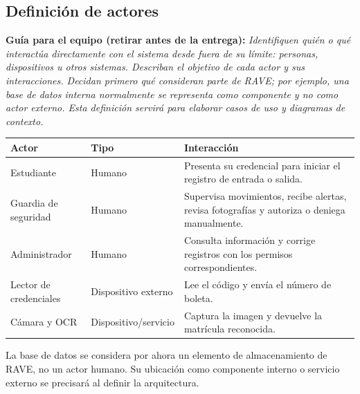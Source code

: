 \documentclass[12pt,letterpaper]{article}
\newcommand{\guia}[1]{\par\smallskip\noindent\textbf{Guía para el equipo (retirar antes de la entrega):} \textit{#1}\par\smallskip}
\begin{document}
\subsection{Definición de actores}
\guia{Identifiquen quién o qué interactúa directamente con el sistema desde fuera de su límite: personas, dispositivos u otros sistemas. Describan el objetivo de cada actor y sus interacciones. Decidan primero qué consideran parte de RAVE; por ejemplo, una base de datos interna normalmente se representa como componente y no como actor externo. Esta definición servirá para elaborar casos de uso y diagramas de contexto.}
\begin{tabularx}{\textwidth}{|p{2.8cm}|p{2.5cm}|X|}
\hline Actor & Tipo & Interacción \\ \hline
Estudiante & Humano & Presenta su credencial para iniciar el registro de entrada o salida. \\ \hline
Guardia de seguridad & Humano & Supervisa movimientos, recibe alertas, revisa fotografías y autoriza o deniega manualmente. \\ \hline
Administrador & Humano & Consulta información y corrige registros con los permisos correspondientes. \\ \hline
Lector de credenciales & Dispositivo externo & Lee el código y envía el número de boleta. \\ \hline
Cámara y OCR & Dispositivo/servicio & Captura la imagen y devuelve la matrícula reconocida. \\ \hline
\end{tabularx}
La base de datos se considera por ahora un elemento de almacenamiento de RAVE, no un actor humano. Su ubicación como componente interno o servicio externo se precisará al definir la arquitectura.
\end{document}
